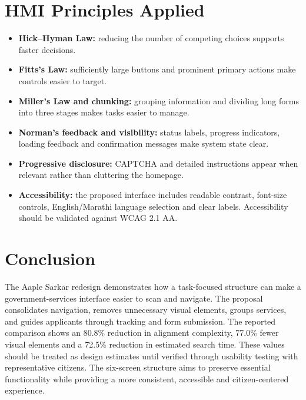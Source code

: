 \documentclass[10pt,a4paper]{article}
\begin{document}
\section{HMI Principles Applied}
\begin{itemize}
\item \textbf{Hick--Hyman Law:} reducing the number of competing choices supports faster decisions.
\item \textbf{Fitts's Law:} sufficiently large buttons and prominent primary actions make controls easier to target.
\item \textbf{Miller's Law and chunking:} grouping information and dividing long forms into three stages makes tasks easier to manage.
\item \textbf{Norman's feedback and visibility:} status labels, progress indicators, loading feedback and confirmation messages make system state clear.
\item \textbf{Progressive disclosure:} CAPTCHA and detailed instructions appear when relevant rather than cluttering the homepage.
\item \textbf{Accessibility:} the proposed interface includes readable contrast, font-size controls, English/Marathi language selection and clear labels. Accessibility should be validated against WCAG 2.1 AA.
\end{itemize}

\section{Conclusion}
The Aaple Sarkar redesign demonstrates how a task-focused structure can make a government-services interface easier to scan and navigate. The proposal consolidates navigation, removes unnecessary visual elements, groups services, and guides applicants through tracking and form submission. The reported comparison shows an 80.8\% reduction in alignment complexity, 77.0\% fewer visual elements and a 72.5\% reduction in estimated search time. These values should be treated as design estimates until verified through usability testing with representative citizens. The six-screen structure aims to preserve essential functionality while providing a more consistent, accessible and citizen-centered experience.
\end{document}
